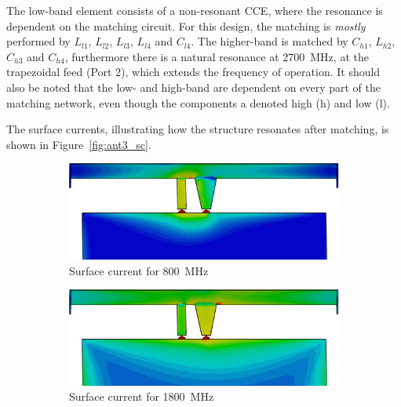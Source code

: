 The low-band element consists of a non-resonant CCE, where the resonance is dependent on the matching circuit. For this design, the matching is \emph{mostly} performed by $L_{l1}$, $L_{l2}$, $L_{l3}$, $L_{l4}$ and $C_{l4}$. The higher-band is matched by $C_{h1}$, $L_{h2}$, $C_{h3}$ and $C_{h4}$, furthermore there is a natural resonance at \SI{2700}{MHz}, at the trapezoidal feed (Port 2), which extends the frequency of operation. It should also be noted that the low- and high-band are dependent on every part of the matching network, even though the components a denoted high (h) and low (l). 
 
The surface currents, illustrating how the structure resonates after matching, is shown in Figure~\ref{fig:ant3_sc}.


\begin{figure}[htbp]
   \begin{subfigure}[b]{0.32\linewidth}
        \centering
        \includegraphics[width=\linewidth]{img/tech_sol/nonresonant/finka-surface-800}
        \caption{Surface current for \SI{800}{MHz}}
        \label{fig:ant3_sc800}
    \end{subfigure}
    \hfill
    \begin{subfigure}[b]{0.32\linewidth}
        \centering
        \includegraphics[width=\linewidth]{img/tech_sol/nonresonant/finka-surface-1800}
        \caption{Surface current for \SI{1800}{MHz}}
        \label{fig:ant3_sc1800}
    \end{subfigure}
    \hfill
    \begin{subfigure}[b]{0.32\linewidth}

\end{subfigure}
\end{figure}

